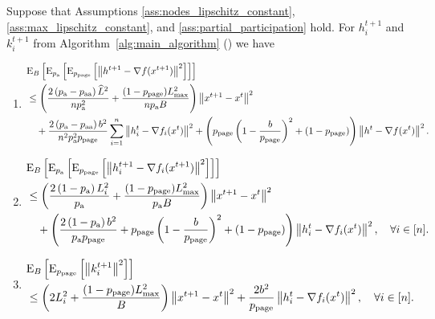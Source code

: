 \documentclass{article}
\newcommand{\algorithmname}{DARIA}
\newcommand*{\probavailable}{\ensuremath{p_{\textnormal{a}}}}
\newcommand*{\probpairaa}{\ensuremath{p_{\textnormal{aa}}}}
\newcommand*{\probpage}{\ensuremath{p_{\text{page}}}}
\begin{document}
\begin{lemma}
  \label{lemma:gradient_page}
  Suppose that Assumptions \ref{ass:nodes_lipschitz_constant}, \ref{ass:max_lipschitz_constant}, and \ref{ass:partial_participation} hold. For $h^{t+1}_i$ and $k^{t+1}_i$ from Algorithm~\ref{alg:main_algorithm} (\algname{\algorithmname-PAGE}) we have
  \begin{enumerate}
  \item
      \begin{align*}
          &\ExpSub{B}{\ExpSub{\probavailable}{\ExpSub{\probpage}{\norm{h^{t+1} - \nabla f(x^{t+1})}^2}}} \\
          & \leq \left(\frac{2 \left(\probavailable - \probpairaa\right) \widehat{L}^2}{n \probavailable^2} + \frac{(1 - \probpage)L_{\max}^2}{n \probavailable B}\right) \norm{x^{t+1} - x^{t}}^2\\
          &\quad + \frac{2\left(\probavailable - \probpairaa\right) b^2}{n^2 \probavailable^2 \probpage}\sum_{i=1}^n\norm{ h^t_i - \nabla f_i(x^{t})}^2 + \left(\probpage\left(1 - \frac{b}{\probpage}\right)^2 + (1 - \probpage)\right)\norm{h^{t} - \nabla f(x^{t})}^2.
      \end{align*}
  \item
      \begin{align*}
          &\ExpSub{B}{\ExpSub{\probavailable}{\ExpSub{\probpage}{\norm{h^{t+1}_i - \nabla f_i(x^{t+1})}^2}}} \\
          & \leq \left(\frac{2\left(1 - \probavailable\right)L_i^2}{\probavailable} + \frac{(1 - \probpage)L_{\max}^2}{\probavailable B}\right) \norm{x^{t+1} - x^{t}}^2 \\
          &\quad +\left(\frac{2\left(1 - \probavailable\right)b^2}{\probavailable \probpage} + \probpage\left(1 - \frac{b}{\probpage}\right)^2 + (1 - \probpage)\right)\norm{h^{t}_i - \nabla f_i(x^{t})}^2, \quad \forall i \in [n].
      \end{align*}
  \item
      \begin{align*}
        &\ExpSub{B}{\ExpSub{\probpage}{\norm{k^{t+1}_i}^2}} \\
        &\leq \left(2 L_i^2 + \frac{(1 - \probpage)L_{\max}^2}{B}\right)\norm{x^{t+1} - x^{t}}^2 +  \frac{2b^2}{\probpage} \norm{h^t_i - \nabla f_i(x^{t})}^2, \quad \forall i \in [n].
      \end{align*}
  \end{enumerate}
\end{lemma}
\end{document}
